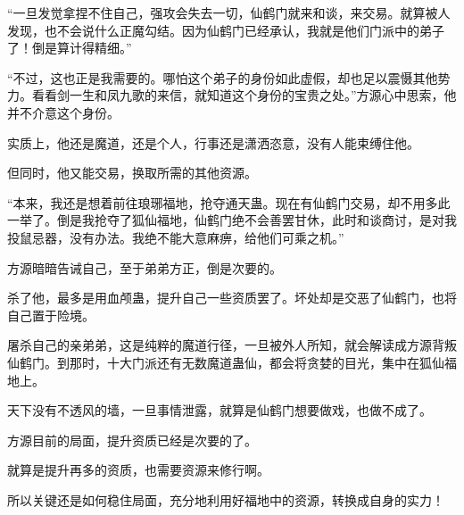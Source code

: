 \begin{this_body}
“一旦发觉拿捏不住自己，强攻会失去一切，仙鹤门就来和谈，来交易。就算被人发现，也不会说什么正魔勾结。因为仙鹤门已经承认，我就是他们门派中的弟子了！倒是算计得精细。”

“不过，这也正是我需要的。哪怕这个弟子的身份如此虚假，却也足以震慑其他势力。看看剑一生和凤九歌的来信，就知道这个身份的宝贵之处。”方源心中思索，他并不介意这个身份。

实质上，他还是魔道，还是个人，行事还是潇洒恣意，没有人能束缚住他。

但同时，他又能交易，换取所需的其他资源。

“本来，我还是想着前往琅琊福地，抢夺通天蛊。现在有仙鹤门交易，却不用多此一举了。倒是我抢夺了狐仙福地，仙鹤门绝不会善罢甘休，此时和谈商讨，是对我投鼠忌器，没有办法。我绝不能大意麻痹，给他们可乘之机。”

方源暗暗告诫自己，至于弟弟方正，倒是次要的。

杀了他，最多是用血颅蛊，提升自己一些资质罢了。坏处却是交恶了仙鹤门，也将自己置于险境。

屠杀自己的亲弟弟，这是纯粹的魔道行径，一旦被外人所知，就会解读成方源背叛仙鹤门。到那时，十大门派还有无数魔道蛊仙，都会将贪婪的目光，集中在狐仙福地上。

天下没有不透风的墙，一旦事情泄露，就算是仙鹤门想要做戏，也做不成了。

方源目前的局面，提升资质已经是次要的了。

就算是提升再多的资质，也需要资源来修行啊。

所以关键还是如何稳住局面，充分地利用好福地中的资源，转换成自身的实力！

\end{this_body}

